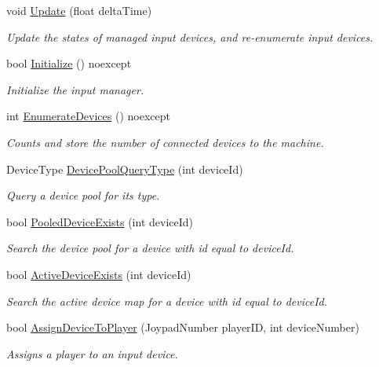 \begin{DoxyCompactItemize}
void \hyperlink{class_blade_1_1_input_manager_a1184a42c2c6b0f96d4169936090f9480}{Update} (float delta\+Time)
\begin{DoxyCompactList}\small\item\em Update the states of managed input devices, and re-\/enumerate input devices. \end{DoxyCompactList}\item 
bool \hyperlink{class_blade_1_1_input_manager_a979db0aea29e22ed95c2642649922a41}{Initialize} () noexcept
\begin{DoxyCompactList}\small\item\em Initialize the input manager. \end{DoxyCompactList}\item 
int \hyperlink{class_blade_1_1_input_manager_afdb7935349eacd9dab51a5b06c8d3864}{Enumerate\+Devices} () noexcept
\begin{DoxyCompactList}\small\item\em Counts and store the number of connected devices to the machine. \end{DoxyCompactList}\item 
Device\+Type \hyperlink{class_blade_1_1_input_manager_a308a056833ddd9aa528ac4fbdbf9df4c}{Device\+Pool\+Query\+Type} (int device\+Id)
\begin{DoxyCompactList}\small\item\em Query a device pool for its type. \end{DoxyCompactList}\item 
bool \hyperlink{class_blade_1_1_input_manager_ae3ccc72d662ee90161206ef64722380f}{Pooled\+Device\+Exists} (int device\+Id)
\begin{DoxyCompactList}\small\item\em Search the device pool for a device with id equal to device\+Id. \end{DoxyCompactList}\item 
bool \hyperlink{class_blade_1_1_input_manager_a6aadb5a4fd8ccfe2de69c1f2d62df37d}{Active\+Device\+Exists} (int device\+Id)
\begin{DoxyCompactList}\small\item\em Search the active device map for a device with id equal to device\+Id. \end{DoxyCompactList}\item 
bool \hyperlink{class_blade_1_1_input_manager_a1c7e8d968e53123e3077c2386eaac7ae}{Assign\+Device\+To\+Player} (Joypad\+Number player\+ID, int device\+Number)
\begin{DoxyCompactList}\small\item\em Assigns a player to an input device. \end{DoxyCompactList}\item 

\end{DoxyCompactItemize}
